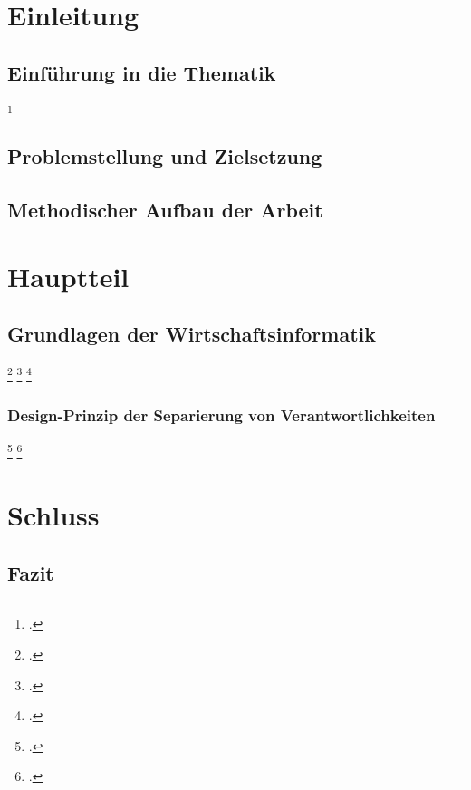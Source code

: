 \section{Einleitung}
\subsection{Einführung in die Thematik}
\blindtext
\blindtext\footcite[Vgl. ][]{mswpf}

\subsection{Problemstellung und Zielsetzung}
\blindtext

\subsection{Methodischer Aufbau der Arbeit}
\blindtext

\section{Hauptteil}
\subsection{Grundlagen der Wirtschaftsinformatik}
\blindtext\footcite[Vgl. ][]{Atypisch}
\blindenumerate
\Blindtext\footcite[Vgl. ][]{msdatabind}
\blindtext\footcite[Vgl. ][415-426]{Tanenbaum2016}

\subsubsection{Design-Prinzip der Separierung von Verantwortlichkeiten}
\blindtext\footcite[Vgl. ][79]{Schelinski2019}
\blinditemize
\Blindtext\footcite[Vgl. ][34]{Digitalökonomie}

\section{Schluss}
\subsection{Fazit}
\Blindtext
